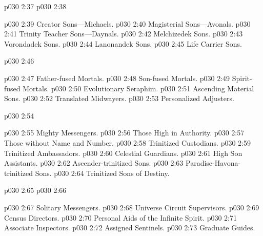 \pc \vs p030 2:37 \bibnobreakspace {}
\pc \vs p030 2:38 \bibnobreakspace {}
\begin{ubquote}
\pc \vs p030 2:39 \bibnobreakspace Creator Sons---Michaels.
\vs p030 2:40 \bibnobreakspace Magisterial Sons---Avonals.
\vs p030 2:41 \bibnobreakspace Trinity Teacher Sons---Daynals.
\vs p030 2:42 \bibnobreakspace Melchizedek Sons.
\vs p030 2:43 \bibnobreakspace Vorondadek Sons.
\vs p030 2:44 \bibnobreakspace Lanonandek Sons.
\vs p030 2:45 \bibnobreakspace Life Carrier Sons.
\end{ubquote}
\pc \vs p030 2:46 \bibnobreakspace {}
\begin{ubquote}
\pc \vs p030 2:47 \bibnobreakspace Father\hyp{}fused Mortals.
\vs p030 2:48 \bibnobreakspace Son\hyp{}fused Mortals.
\vs p030 2:49 \bibnobreakspace Spirit\hyp{}fused Mortals.
\vs p030 2:50 \bibnobreakspace Evolutionary Seraphim.
\vs p030 2:51 \bibnobreakspace Ascending Material Sons.
\vs p030 2:52 \bibnobreakspace Translated Midwayers.
\vs p030 2:53 \bibnobreakspace Personalized Adjusters.
\end{ubquote}
\pc \vs p030 2:54 \bibnobreakspace {}
\begin{ubquote}
\pc \vs p030 2:55 \bibnobreakspace Mighty Messengers.
\vs p030 2:56 \bibnobreakspace Those High in Authority.
\vs p030 2:57 \bibnobreakspace Those without Name and Number.
\vs p030 2:58 \bibnobreakspace Trinitized Custodians.
\vs p030 2:59 \bibnobreakspace Trinitized Ambassadors.
\vs p030 2:60 \bibnobreakspace Celestial Guardians.
\vs p030 2:61 \bibnobreakspace High Son Assistants.
\vs p030 2:62 \bibnobreakspace Ascender\hyp{}trinitized Sons.
\vs p030 2:63 \bibnobreakspace Paradise\hyp{}Havona\hyp{}trinitized Sons.
\vs p030 2:64 \bibnobreakspace Trinitized Sons of Destiny.
\end{ubquote}
\pc \vs p030 2:65 \bibnobreakspace {}
\pc \vs p030 2:66 \bibnobreakspace {}
\begin{ubquote}
\pc \vs p030 2:67 \bibnobreakspace Solitary Messengers.
\vs p030 2:68 \bibnobreakspace Universe Circuit Supervisors.
\vs p030 2:69 \bibnobreakspace Census Directors.
\vs p030 2:70 \bibnobreakspace Personal Aids of the Infinite Spirit.
\vs p030 2:71 \bibnobreakspace Associate Inspectors.
\vs p030 2:72 \bibnobreakspace Assigned Sentinels.
\vs p030 2:73 \bibnobreakspace Graduate Guides.
\end{ubquote}
